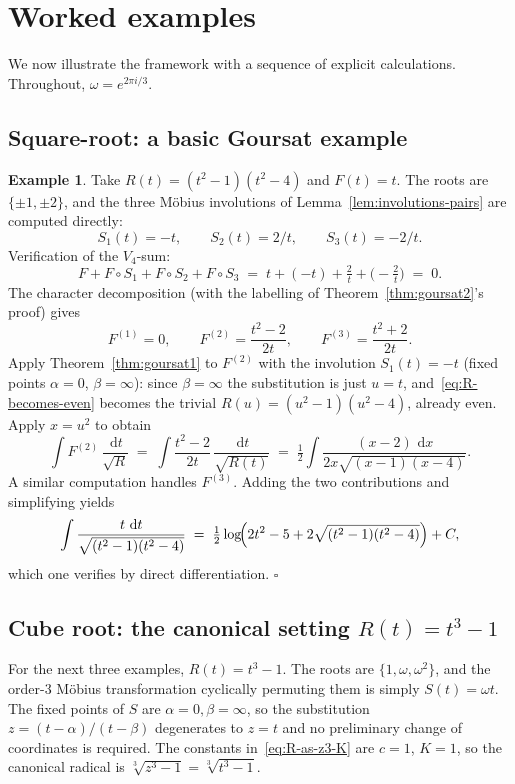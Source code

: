 \documentclass[11pt,a4paper]{article}
\theoremstyle{plain}
\theoremstyle{definition}
\newtheorem{example}[theorem]{Example}
\theoremstyle{remark}
\renewcommand{\d}{\,\mathrm{d}}
\begin{document}
\section{Worked examples}
\label{sec:examples}

We now illustrate the framework with a sequence of explicit calculations. Throughout, $\omega = e^{2\pi i/3}$.

\subsection{Square-root: a basic Goursat example}

\begin{example}\label{ex:goursat-basic}
Take $R(t) = (t^2-1)(t^2-4)$ and $F(t)=t$. The roots are $\{\pm 1, \pm 2\}$, and the three M\"obius involutions of Lemma~\ref{lem:involutions-pairs} are computed directly:
\[
  S_1(t) = -t,\qquad S_2(t) = 2/t,\qquad S_3(t) = -2/t.
\]
Verification of the $V_4$-sum:
\[
  F + F\!\circ\! S_1 + F\!\circ\! S_2 + F\!\circ\! S_3 \;=\; t + (-t) + \tfrac{2}{t} + \bigl(-\tfrac{2}{t}\bigr) \;=\; 0.
\]
The character decomposition (with the labelling of Theorem~\ref{thm:goursat2}'s proof) gives
\[
  F^{(1)} = 0,\qquad F^{(2)} = \frac{t^2-2}{2t},\qquad F^{(3)} = \frac{t^2+2}{2t}.
\]
Apply Theorem~\ref{thm:goursat1} to $F^{(2)}$ with the involution $S_1(t)=-t$ (fixed points $\alpha=0$, $\beta=\infty$): since $\beta=\infty$ the substitution is just $u=t$, and~\eqref{eq:R-becomes-even} becomes the trivial $R(u) = (u^2-1)(u^2-4)$, already even. Apply $x = u^2$ to obtain
\[
  \int F^{(2)}\,\frac{\d t}{\sqrt{R}} \;=\; \int \frac{t^2-2}{2t}\,\frac{\d t}{\sqrt{R(t)}}
  \;=\; \tfrac{1}{2}\int \frac{(x-2)\,\d x}{2x\sqrt{(x-1)(x-4)}}.
\]
A similar computation handles $F^{(3)}$. Adding the two contributions and simplifying yields
\[
  \int \frac{t\,\d t}{\sqrt{(t^2-1)(t^2-4)}} \;=\; \tfrac{1}{2}\log\!\Bigl(2t^2 - 5 + 2\sqrt{(t^2-1)(t^2-4)}\Bigr) + C,
\]
which one verifies by direct differentiation. \hfill$\square$
\end{example}

\subsection{Cube root: the canonical setting $R(t)=t^3-1$}

For the next three examples, $R(t)=t^3-1$. The roots are $\{1,\omega,\omega^2\}$, and the order-$3$ M\"obius transformation cyclically permuting them is simply $S(t) = \omega t$. The fixed points of $S$ are $\alpha=0,\beta=\infty$, so the substitution $z=(t-\alpha)/(t-\beta)$ degenerates to $z=t$ and no preliminary change of coordinates is required. The constants in~\eqref{eq:R-as-z3-K} are $c=1$, $K=1$, so the canonical radical is $\sqrt[3]{z^3-1}=\sqrt[3]{t^3-1}$.
\end{document}
